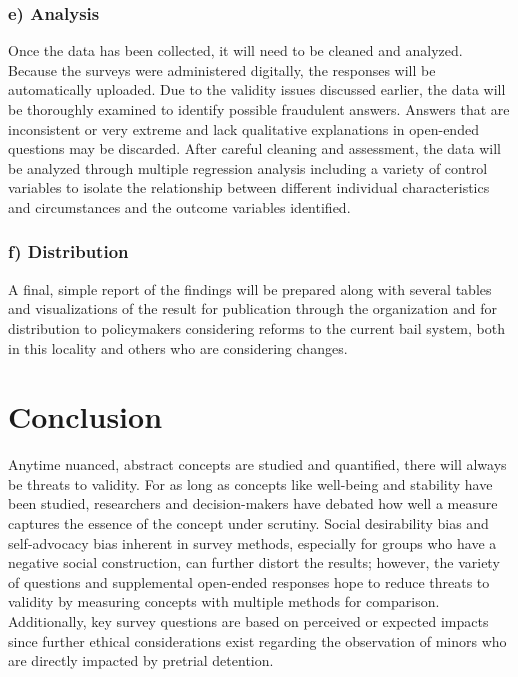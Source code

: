\documentclass[
  letterpaper,
  DIV=11,
  numbers=noendperiod]{scrartcl}
\begin{document}
\hypertarget{e-analysis}{%
\subsubsection{e) Analysis}\label{e-analysis}}

Once the data has been collected, it will need to be cleaned and
analyzed. Because the surveys were administered digitally, the responses
will be automatically uploaded. Due to the validity issues discussed
earlier, the data will be thoroughly examined to identify possible
fraudulent answers. Answers that are inconsistent or very extreme and
lack qualitative explanations in open-ended questions may be discarded.
After careful cleaning and assessment, the data will be analyzed through
multiple regression analysis including a variety of control variables to
isolate the relationship between different individual characteristics
and circumstances and the outcome variables identified.

\hypertarget{f-distribution}{%
\subsubsection{f) Distribution}\label{f-distribution}}

A final, simple report of the findings will be prepared along with
several tables and visualizations of the result for publication through
the organization and for distribution to policymakers considering
reforms to the current bail system, both in this locality and others who
are considering changes.

\hypertarget{conclusion}{%
\section{Conclusion}\label{conclusion}}

Anytime nuanced, abstract concepts are studied and quantified, there
will always be threats to validity. For as long as concepts like
well-being and stability have been studied, researchers and
decision-makers have debated how well a measure captures the essence of
the concept under scrutiny. Social desirability bias and self-advocacy
bias inherent in survey methods, especially for groups who have a
negative social construction, can further distort the results; however,
the variety of questions and supplemental open-ended responses hope to
reduce threats to validity by measuring concepts with multiple methods
for comparison. Additionally, key survey questions are based on
perceived or expected impacts since further ethical considerations exist
regarding the observation of minors who are directly impacted by
pretrial detention.
\end{document}
